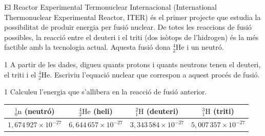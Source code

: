 El Reactor Experimental Termonuclear Internacional (International Thermonuclear Experimental Reactor, ITER) és el primer projecte que estudia la possibilitat de produir energia per fusió nuclear. De totes les reaccions de fusió possibles, la reacció entre el deuteri i el triti (dos isòtops de l'hidrogen) és la més factible amb la tecnologia actual. Aquesta fusió dona ${}^{4}_{2}\mathrm{He}$ i un neutró.

\begin{apartat}{1}
A partir de les dades, digueu quants protons i quants neutrons tenen el deuteri, el triti i el ${}^{4}_{2}\mathrm{He}$. Escriviu l'equació nuclear que correspon a aquest procés de fusió.
\end{apartat}

\begin{apartat}{1}
Calculeu l'energia que s'allibera en la reacció de fusió anterior.
\end{apartat}


{\centering\renewcommand{\arraystretch}{1.4}
\begin{tabular}{|c|c|c|c|}
\hline
${}^{1}_{0}\mathrm{n}$ (neutró) & ${}^{4}_{2}\mathrm{He}$ (heli) & ${}^{2}_{1}\mathrm{H}$ (deuteri) & ${}^{3}_{1}\mathrm{H}$ (triti)\\
\hline
$1,674\,927\times 10^{-27}$ & $6,644\,657\times 10^{-27}$ & $3,343\,584\times 10^{-27}$ & $5,007\,357\times 10^{-27}$\\
\hline
\end{tabular}\par}
